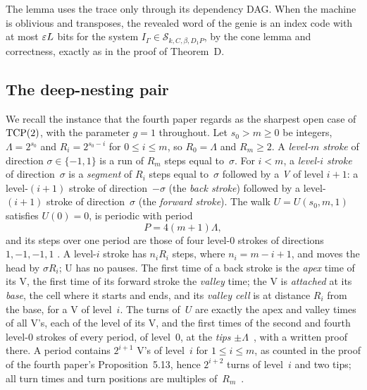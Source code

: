 The lemma uses the trace only through its dependency DAG. When the machine is oblivious and transposes, the revealed word
of the genie is an index code with at most $\varepsilon L$ bits for the system $I_\Gamma\in\mathcal S_{k,C,\beta,D_1P}$, by the
cone lemma and correctness, exactly as in the proof of Theorem~D.

\subsection{The deep-nesting pair}\label{sec:prelim-dnp}

We recall the instance that the fourth paper regards as the sharpest open case of $\mathrm{TCP}(2)$, with the parameter $g=1$
throughout. Let $s_0>m\ge0$ be integers, $\Lambda=2^{s_0}$ and $R_i=2^{s_0-i}$ for $0\le i\le m$, so $R_0=\Lambda$
and $R_m\ge2$. A \emph{level-$m$ stroke} of direction $\sigma\in\{-1,1\}$ is a run of $R_m$ steps equal to~$\sigma$. For
$i<m$, a \emph{level-$i$ stroke} of direction~$\sigma$ is a \emph{segment} of $R_i$ steps equal to~$\sigma$ followed by a
\emph{V} of level $i+1$: a level-$(i+1)$ stroke of direction~$-\sigma$ (the \emph{back stroke}) followed by a
level-$(i+1)$ stroke of direction~$\sigma$ (the \emph{forward stroke}). The walk $U=U(s_0,m,1)$ satisfies $U(0)=0$,
is periodic with period
\[
  P=4(m+1)\Lambda,
\]
and its steps over one period are those of four level-$0$ strokes of directions $1,-1,-1,1$
\cite[Definition~5.3]{FourthPaper2026}. A level-$i$ stroke has $n_iR_i$ steps, where $n_i=m-i+1$, and moves the head by
$\sigma R_i$; U has no pauses. The first time of a back stroke is the \emph{apex} time of its V, the first time of its
forward stroke the \emph{valley} time; the V is \emph{attached} at its \emph{base}, the cell where it starts and ends, and
its \emph{valley cell} is at distance $R_i$ from the base, for a V of level~$i$. The turns of~$U$ are exactly the apex and
valley times of all V's, each of the level of its V, and the first times of the second and fourth level-$0$ strokes of
every period, of level~$0$, at the \emph{tips} $\pm\Lambda$~\cite[Lemma~5.4]{FourthPaper2026}, with a written proof
there. A period contains $2^{i+1}$ V's of level~$i$ for $1\le i\le m$, as counted in the proof of the fourth paper's
Proposition~5.13, hence $2^{i+2}$ turns of level~$i$ and two tips; all turn times and turn positions are multiples
of~$R_m$~\cite[Remark~5.23]{FourthPaper2026}.

